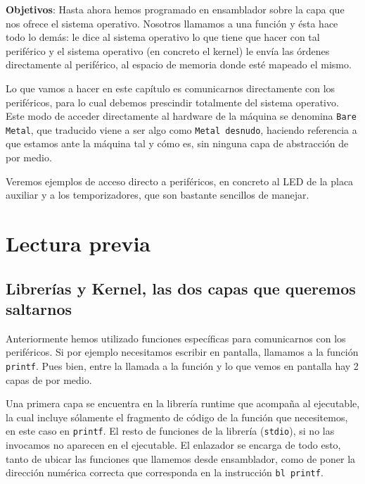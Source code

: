 %

\label{chp:Subrut}
\minitoc

{\bf Objetivos}: Hasta ahora hemos programado en ensamblador sobre
la capa que nos ofrece el sistema operativo. Nosotros llamamos a una
función y ésta hace todo lo demás: le dice al sistema operativo lo
que tiene que hacer con tal periférico y el sistema operativo (en concreto
el kernel) le envía las órdenes directamente al periférico, al espacio
de memoria donde esté mapeado el mismo.

Lo que vamos a hacer en este capítulo es comunicarnos directamente con los
periféricos, para lo cual debemos prescindir totalmente del sistema operativo.
Este modo de acceder directamente al hardware de la máquina se denomina {\tt Bare Metal},
que traducido viene a ser algo como {\tt Metal desnudo}, haciendo referencia a
que estamos ante la máquina tal y cómo es, sin ninguna capa de abstracción de
por medio.

Veremos ejemplos de acceso directo a periféricos, en concreto al LED de la placa
auxiliar y a los temporizadores, que son bastante sencillos de manejar.

\section{Lectura previa}

\subsection{Librerías y Kernel, las dos capas que queremos saltarnos}

Anteriormente hemos utilizado funciones específicas para
comunicarnos con los periféricos. Si por ejemplo necesitamos escribir
en pantalla, llamamos a la función {\tt printf}. Pues bien, entre
la llamada a la función y lo que vemos en pantalla hay 2 capas de por medio.

Una primera capa se encuentra en la librería runtime que acompaña al
ejecutable, la cual incluye sólamente el fragmento de código de la
función que necesitemos, en este caso en {\tt printf}. El resto de
funciones de la librería ({\tt stdio}), si no las invocamos no aparecen
en el ejecutable. El enlazador se encarga de todo esto, tanto de ubicar
las funciones que llamemos desde ensamblador, como de poner la dirección
numérica correcta que corresponda en la instrucción {\tt bl printf}.

